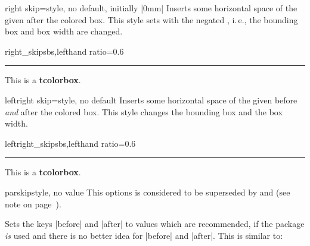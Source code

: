 \begin{docTcbKey}[][doc new=2014-11-07]{right skip}{=}{style, no default, initially |0mm|}
  Inserts some horizontal space of the given  after the colored box.
  This style sets  with the negated ,
  i.\,e., the bounding box and box width are changed.
\begin{exdispExample*}{right_skip}{sbs,lefthand ratio=0.6}
\noindent\rule{\linewidth}{2pt}

\begin{tcolorbox}[right skip=1cm,
    colframe=red!50!white]
  This is a \textbf{tcolorbox}.
\end{tcolorbox}
\end{exdispExample*}
\end{docTcbKey}

\begin{docTcbKey}[][doc new=2014-10-10]{leftright skip}{=}{style, no default}
  Inserts some horizontal space of the given  before \emph{and} after the colored box.
  This style changes the bounding box and the box width.
\begin{exdispExample*}{leftright_skip}{sbs,lefthand ratio=0.6}
\noindent\rule{\linewidth}{2pt}

\begin{tcolorbox}[leftright skip=1cm,
    colframe=red!50!white]
  This is a \textbf{tcolorbox}.
\end{tcolorbox}
\end{exdispExample*}
\end{docTcbKey}


\clearpage

\begin{docTcbKey}[][doc updated=2017-02-01]{parskip}{}{style, no value}
  This options is considered to be superseded by
   and 
  (see note on page~\pageref{subsec:surroundings}).\par
  Sets the keys |before| and |after| to values which are
  recommended, if the package  \emph{is} used and there is no better
  idea for |before| and |after|. This is similar to:
\begin{dispListing}
\end{dispListing}
\end{docTcbKey}

